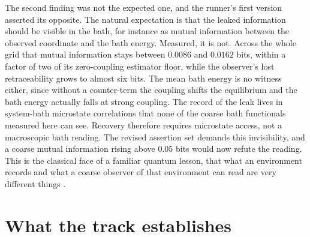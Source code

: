 \documentclass[aps,pre,reprint,nofootinbib]{revtex4-2}
\begin{document}
The second finding was not the expected one, and the runner's first
version asserted its opposite.  The natural expectation is that the
leaked information should be visible in the bath, for instance as mutual
information between the observed coordinate and the bath energy.
Measured, it is not.  Across the whole grid that mutual information stays
between $0.0086$ and $0.0162$ bits, within a factor of two of its
zero-coupling estimator floor, while the observer's lost retraceability
grows to almost six bits.  The mean bath energy is no witness either,
since without a counter-term the coupling shifts the equilibrium and the
bath energy actually falls at strong coupling.  The record of the leak
lives in system-bath microstate correlations that none of the coarse bath
functionals measured here can see.  Recovery therefore requires
microstate access, not a macroscopic bath reading.  The revised assertion
set demands this invisibility, and a coarse mutual information rising
above $0.05$ bits would now refute the reading.  This is the classical
face of a familiar quantum lesson, that what an environment records and
what a coarse observer of that environment can read are very different
things \cite{Zurek2003}.

\section{What the track establishes}
\label{sec:claims}
\end{document}
